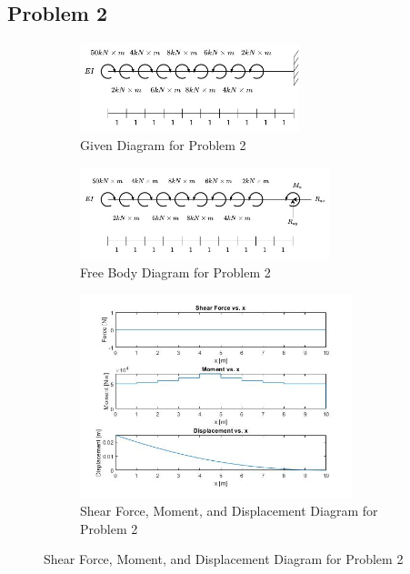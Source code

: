 \documentclass[a4paper]{article}
\begin{document}
\subsection{Problem 2}
\begin{figure}[H]
\centering
   \begin{subfigure}[b]{\textwidth}
   \centering
   \includegraphics[width=0.7\textwidth]{problems/prob_2.jpg}
   \caption{Given Diagram for Problem 2}
   \label{prob2:prob} 
\end{subfigure}
\begin{subfigure}[b]{\textwidth}
   \centering   
   \includegraphics[width=0.8\textwidth]{FBD/FBD_2.jpg}
   \caption{Free Body Diagram for Problem 2}
   \label{prob2:FBD}
\end{subfigure}
\begin{subfigure}[b]{\textwidth}
   \centering   
   \includegraphics[width=0.87\textwidth]{results/solution_2.jpg}
   \caption{Shear Force, Moment, and Displacement Diagram for Problem 2}
   \label{prob2:results}
\end{subfigure}
\label{prob2}
\end{figure}
\end{document}
